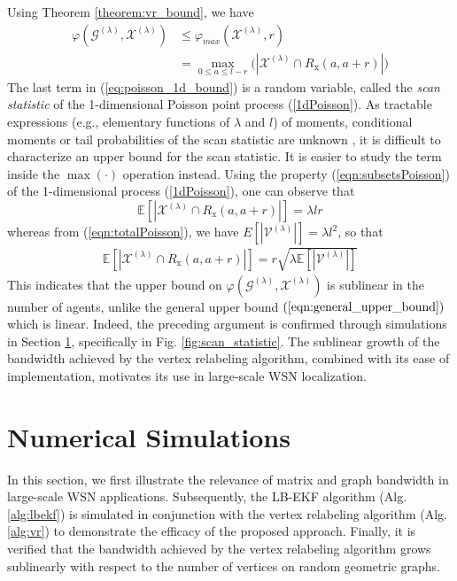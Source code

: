 \documentclass[twocolumn]{article}
\theoremstyle{plain}
\theoremstyle{definition}
\theoremstyle{definition}
\theoremstyle{remark}
\begin{document}
Using Theorem \ref{theorem:vr_bound}, we have
\begin{align}
\varphi (\mathcal G^{(\lambda)}, \mathcal X^{(\lambda)}) & \leq \varphi_\textit{max} (\mathcal X^{(\lambda)}, r) \nonumber \\
&= \max_{0\leq a\leq l-r}\Big( | \mathcal{X}^{(\lambda)}\cap \textit{R}_\textrm{x}(a,a+r) | \Big)
\label{eq:poisson_1d_bound}
\end{align}
The last term in (\ref{eq:poisson_1d_bound}) is a random variable, called the \textit{scan statistic} of the 1-dimensional Poisson point process (\ref{1dPoisson}). As tractable expressions (e.g., elementary functions of $\lambda$ and $l$) of moments, conditional moments or tail probabilities of the scan statistic are unknown \cite{glaz2001scan}, it is difficult to characterize an upper bound for the scan statistic. It is easier to study the term inside the $\max(\cdot)$ operation instead. Using the property (\ref{eqn:subsetsPoisson}) of the 1-dimensional process (\ref{1dPoisson}), one can observe that
\begin{equation}
\mathbb E \left[| \mathcal{X}^{(\lambda)}\cap \textit{R}_\textrm{x}(a,a+r) | \right] = \lambda lr 
\end{equation}
whereas from (\ref{eqn:totalPoisson}), we have $E\left[|\mathcal V^{(\lambda)}| \right] = \lambda l^2$, so that
\begin{align}
\mathbb E \left[| \mathcal{X}^{(\lambda)}\cap \textit{R}_\textrm{x}(a,a+r) | \right] = r \sqrt{\lambda \mathbb E\left[|\mathcal V^{(\lambda)}| \right]}
\label{eq:sublinear_growth}
\end{align}
This indicates that the upper bound on $\varphi(\mathcal G^{(\lambda)}, \mathcal X^{(\lambda)})$ is sublinear in the number of agents, unlike the general upper bound $(\ref{eqn:general_upper_bound})$ which is linear. Indeed, the preceding argument is confirmed through simulations in Section \ref{sec:simulations}, specifically in Fig. \ref{fig:scan_statistic}.
The sublinear growth of the bandwidth achieved by the vertex relabeling algorithm, combined with its ease of implementation, motivates its use in large-scale WSN localization.
\section{Numerical Simulations}
\label{sec:simulations}
In this section, we first illustrate the relevance of matrix and graph bandwidth in large-scale WSN applications. Subsequently, the LB-EKF algorithm (Alg. \ref{alg:lbekf}) is simulated in conjunction with the vertex relabeling algorithm (Alg. \ref{alg:vr}) to demonstrate the efficacy of the proposed approach. Finally, it is verified that the bandwidth achieved by the vertex relabeling algorithm grows sublinearly with respect to the number of vertices on random geometric graphs.
\end{document}
